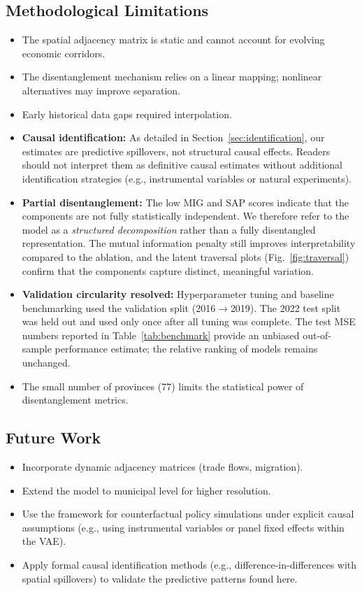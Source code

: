 \documentclass[conference]{IEEEtran}
\begin{document}
\subsection{Methodological Limitations}
\begin{itemize}
\item The spatial adjacency matrix is static and cannot account for evolving economic corridors.
\item The disentanglement mechanism relies on a linear mapping; nonlinear alternatives may improve separation.
\item Early historical data gaps required interpolation.
\item \textbf{Causal identification:} As detailed in Section~\ref{sec:identification}, our estimates are predictive spillovers, not structural causal effects. Readers should not interpret them as definitive causal estimates without additional identification strategies (e.g., instrumental variables or natural experiments).
\item \textbf{Partial disentanglement:} The low MIG and SAP scores indicate that the components are not fully statistically independent. We therefore refer to the model as a \textit{structured decomposition} rather than a fully disentangled representation. The mutual information penalty still improves interpretability compared to the ablation, and the latent traversal plots (Fig.~\ref{fig:traversal}) confirm that the components capture distinct, meaningful variation.
\item \textbf{Validation circularity resolved:} Hyperparameter tuning and baseline benchmarking used the validation split (2016$\to$2019). The 2022 test split was held out and used only once after all tuning was complete. The test MSE numbers reported in Table~\ref{tab:benchmark} provide an unbiased out-of-sample performance estimate; the relative ranking of models remains unchanged.
\item The small number of provinces (77) limits the statistical power of disentanglement metrics.
\end{itemize}

\subsection{Future Work}
\begin{itemize}
\item Incorporate dynamic adjacency matrices (trade flows, migration).
\item Extend the model to municipal level for higher resolution.
\item Use the framework for counterfactual policy simulations under explicit causal assumptions (e.g., using instrumental variables or panel fixed effects within the VAE).
\item Apply formal causal identification methods (e.g., difference-in-differences with spatial spillovers) to validate the predictive patterns found here.
\end{itemize}
\end{document}
